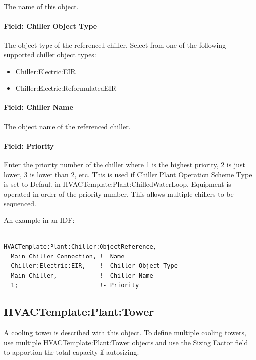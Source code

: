 The name of this object.

\paragraph{Field: Chiller Object Type}\label{field-chiller-object-type}

The object type of the referenced chiller. Select from one of the following supported chiller object types:

\begin{itemize}
\item
  Chiller:Electric:EIR
\item
  Chiller:Electric:ReformulatedEIR
\end{itemize}

\paragraph{Field: Chiller Name}\label{field-chiller-name}

The object name of the referenced chiller.

\paragraph{Field: Priority}\label{field-priority-1}

Enter the priority number of the chiller where 1 is the highest priority, 2 is just lower, 3 is lower than 2, etc. This is used if Chiller Plant Operation Scheme Type is set to Default in HVACTemplate:Plant:ChilledWaterLoop. Equipment is operated in order of the priority number. This allows multiple chillers to be sequenced.

An example in an IDF:

\begin{lstlisting}

HVACTemplate:Plant:Chiller:ObjectReference,
  Main Chiller Connection, !- Name
  Chiller:Electric:EIR,    !- Chiller Object Type
  Main Chiller,            !- Chiller Name
  1;                       !- Priority
\end{lstlisting}

\subsection{HVACTemplate:Plant:Tower}\label{hvactemplateplanttower}

A cooling tower is described with this object. To define multiple cooling towers, use multiple HVACTemplate:Plant:Tower objects and use the Sizing Factor field to apportion the total capacity if autosizing.

